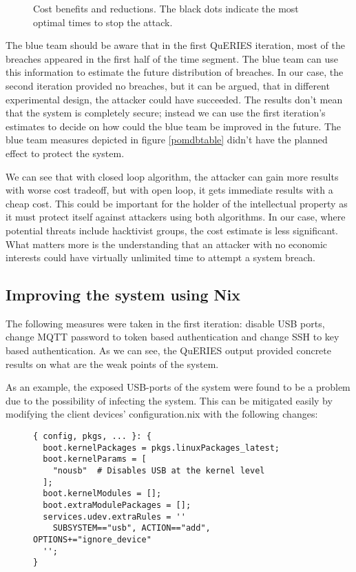 \begin{figure}[t!]
\centerline{}
\caption{Cost benefits and reductions. The black dots indicate the
  most optimal times to stop the attack.}
\label{openandclosed}
\end{figure}

The blue team should be aware that in the first QuERIES iteration,
most of the breaches appeared in the first half of the time
segment. The blue team can use this information to estimate the future
distribution of breaches. In our case, the second iteration provided
no breaches, but it can be argued, that in different experimental
design, the attacker could have succeeded. The results don't mean that
the system is completely secure; instead we can use the first
iteration's estimates to decide on how could the blue team be improved
in the future. The blue team measures depicted in figure
\ref{pomdbtable} didn't have the planned effect to protect the system.

We can see that with closed loop algorithm, the attacker can gain more
results with worse cost tradeoff, but with open loop, it gets
immediate results with a cheap cost. This could be important for the
holder of the intellectual property as it must protect itself against
attackers using both algorithms. In our case, where potential threats
include hacktivist groups, the cost estimate is less significant. What
matters more is the understanding that an attacker with no economic
interests could have virtually unlimited time to attempt a system
breach.

\subsection{Improving the system using Nix}\label{improvingwithnix}

The following measures were taken in the first iteration: disable USB
ports, change MQTT password to token based authentication and change
SSH to key based authentication. As we can see, the QuERIES output
provided concrete results on what are the weak points of the system.

As an example, the exposed USB-ports of the system were found to be a
problem due to the possibility of infecting the system. This can be mitigated easily by modifying the
client devices' configuration.nix with the following changes:

\begin{figure}[H]
\begin{lstlisting} 
{ config, pkgs, ... }: {
  boot.kernelPackages = pkgs.linuxPackages_latest;
  boot.kernelParams = [
    "nousb"  # Disables USB at the kernel level
  ];
  boot.kernelModules = [];
  boot.extraModulePackages = [];
  services.udev.extraRules = ''
    SUBSYSTEM=="usb", ACTION=="add", OPTIONS+="ignore_device"
  '';
}
\end{lstlisting}
\label{kernelsnippet}
\end{figure}

